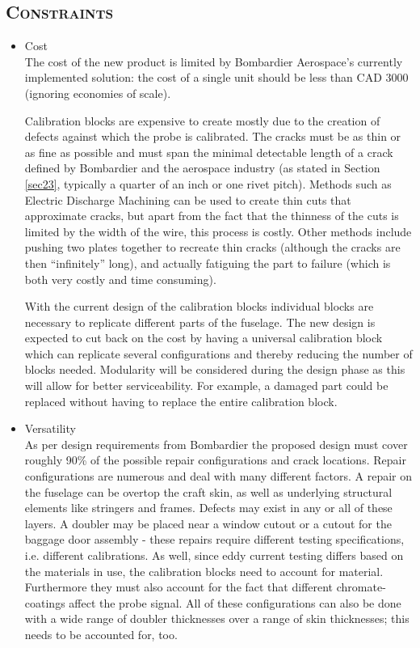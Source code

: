 \documentclass[12pt]{article}
\begin{document}
\subsection{\textsc{Constraints}}
\begin{itemize}

\item Cost \hfill \\
The cost of the new product is limited by Bombardier Aerospace's currently implemented solution: the cost of a single unit should be less than CAD 3000 (ignoring economies of scale).

\hskip 15pt 
Calibration blocks are expensive to create mostly due to the creation of defects against which the probe is calibrated. The cracks must be as thin or as fine as possible and must span the minimal detectable length of a crack defined by Bombardier and the aerospace industry (as stated in Section \ref{sec23}, typically a quarter of an inch or one rivet pitch). Methods such as Electric Discharge Machining can be used to create thin cuts that approximate cracks, but apart from the fact that the thinness of the cuts is limited by the width of the wire, this process is costly. Other methods include pushing two plates together to recreate thin cracks (although the cracks are then ``infinitely'' long), and actually fatiguing the part to failure (which is both very costly and time consuming). 

\hskip 15pt 
With the current design of the calibration blocks individual blocks are necessary to replicate different parts of the fuselage. The new design is expected to cut back on the cost by having a universal calibration block which can replicate several configurations and thereby reducing the number of blocks needed. Modularity will be considered during the design phase as this will allow for better serviceability. For example, a damaged part could be replaced without having to replace the entire calibration block.

\item Versatility \hfill \\
As per design requirements from Bombardier the proposed design must cover roughly 90\% of the possible repair configurations and crack locations. Repair configurations are numerous and deal with many different factors. A repair on the fuselage can be overtop the craft skin, as well as underlying structural elements like stringers and frames. Defects may exist in any or all of these layers. A doubler may be placed near a window cutout or a cutout for the baggage door assembly - these repairs require different testing specifications, i.e. different calibrations. As well, since eddy current testing differs based on the materials in use, the calibration blocks need to account for material. Furthermore they must also account for the fact that different chromate-coatings affect the probe signal. All of these configurations can also be done with a wide range of doubler thicknesses over a range of skin thicknesses; this needs to be accounted for, too. 


\end{itemize}
\end{document}
